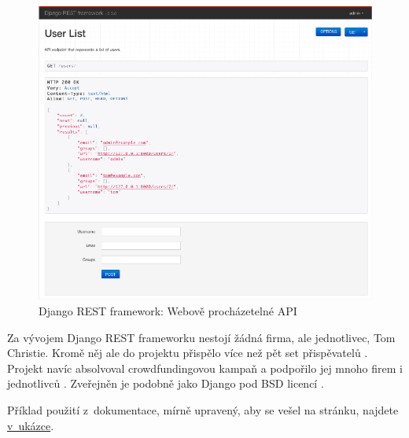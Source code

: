 \begin{figure}
\centering
\includegraphics{images/django-rest-framework-browsable}
\caption{Django REST framework: Webově procházetelné API \autocite{djangorest}\label{pic:djangorestbrowsable}}
\end{figure}

Za vývojem Django REST frameworku nestojí žádná firma, ale jednotlivec, Tom Christie. Kromě něj ale do projektu přispělo více než pět set přispěvatelů \autocite{djangorestcontributors}. Projekt navíc absolvoval crowdfundingovou kampaň a podpořilo jej mnoho firem i jednotlivců \autocite{djangorestkickstarter}. Zveřejněn je podobně jako Django pod BSD licencí \autocite{BSD2}.

Příklad použití z~dokumentace, mírně upravený, aby se vešel na stránku, najdete \protect\hyperlink{code:djangorest}{v~ukázce}.

